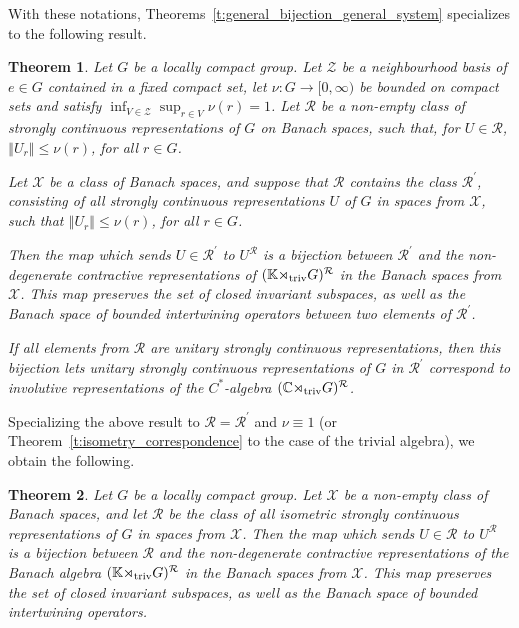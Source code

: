 \documentclass{amsart}
\theoremstyle{plain}
\newtheorem{theorem}{Theorem}[section]
\theoremstyle{definition}
\numberwithin{equation}{section}
\begin{document}
With these notations, Theorems~\ref{t:general_bijection_general_system} specializes to the following result.

\begin{theorem}\label{t:general_bijection_trivial_algebra}
Let $G$ be a locally compact group. Let $\mathcal{Z}$ be a neighbourhood basis of $e \in G$ contained in a fixed compact set, let $\nu: G \to [0, \infty)$ be bounded on compact sets and satisfy $\inf_{V \in \mathcal{Z}} \sup_{r \in V} \nu(r) = 1$. Let ${\mathcal R}$ be a non-empty class of strongly continuous representations of $G$ on Banach spaces, such that, for $U\in{\mathcal R}$, ${\left\Vert {U_r} \right\Vert} \leq \nu(r)$, for all $r\in G$.

Let ${\mathcal X}$ be a class of Banach spaces, and suppose that ${\mathcal R}$ contains the class ${\mathcal R}^\prime$, consisting of all strongly continuous representations $U$ of $G$ in spaces from ${\mathcal X}$, such that ${\left\Vert {U_r} \right\Vert}\leq \nu(r)$, for all $r\in G$.

Then the map which sends $U\in{\mathcal R}^\prime$ to $U^{\mathcal R}$ is a bijection between ${\mathcal R}^\prime$ and the non-degenerate contractive representations of $(\mathbb K{\rtimes}_{\textup{triv}} G)^{\mathcal R}$ in the Banach spaces from $\mathcal X$. This map preserves the set of closed invariant subspaces, as well as the Banach space of bounded intertwining operators between two elements of ${\mathcal R}^\prime$.

If all elements from ${\mathcal R}$ are unitary strongly continuous representations, then this bijection lets unitary strongly continuous representations of $G$ in ${\mathcal R}^\prime$ correspond to involutive representations of the $C^*$-algebra $(\mathbb C{\rtimes}_{\textup{triv}} G)^{\mathcal R}$.

\end{theorem}

Specializing the above result to ${\mathcal R}={\mathcal R}^\prime$ and $\nu\equiv 1$ (or Theorem~\ref{t:isometry_correspondence} to the case of the trivial algebra), we obtain the following.

\begin{theorem}\label{t:group_algebra_isometric_case} Let $G$ be a locally compact group.
Let $\mathcal X$ be a non-empty class of Banach spaces, and let $\mathcal{R}$ be the class of all isometric strongly continuous representations of $G$ in spaces from $\mathcal X$. Then the map which sends $U\in\mathcal R$ to $U^{\mathcal R}$ is a bijection between $\mathcal R$ and the non-degenerate contractive representations of the Banach algebra $(\mathbb K{\rtimes}_{\textup{triv}} G)^{\mathcal R}$ in the Banach spaces from $\mathcal X$. This map preserves the set of closed invariant subspaces, as well as the Banach space of bounded intertwining operators.
\end{theorem}
\end{document}
